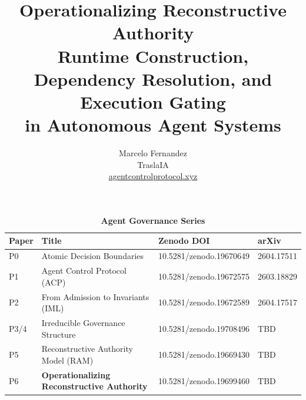 \documentclass[11pt]{article}
\title{\textbf{Operationalizing Reconstructive Authority}\\[4pt]
       \large Runtime Construction, Dependency Resolution, and Execution Gating\\
       in Autonomous Agent Systems}
\author{Marcelo Fernandez\\[2pt]
        \small TraslaIA\\[2pt]
        \small \href{https://agentcontrolprotocol.xyz}{agentcontrolprotocol.xyz}}
\date{}
\begin{document}
\maketitle


\begin{table}[h!]
\centering
\small
\caption*{\textbf{Agent Governance Series}}
\begin{tabular}{@{}llll@{}}
\toprule
\textbf{Paper} & \textbf{Title} & \textbf{Zenodo DOI} & \textbf{arXiv} \\
\midrule
P0 & Atomic Decision Boundaries~\cite{fernandez2026a}           & 10.5281/zenodo.19670649 & 2604.17511 \\
P1 & Agent Control Protocol (ACP)~\cite{fernandez2026b}         & 10.5281/zenodo.19672575 & 2603.18829 \\
P2 & From Admission to Invariants (IML)~\cite{fernandez2026c}   & 10.5281/zenodo.19672589 & 2604.17517 \\
P3/4 & Irreducible Governance Structure~\cite{fernandez2026govstr} & 10.5281/zenodo.19708496 & TBD \\
P5 & Reconstructive Authority Model (RAM)~\cite{fernandez2026ram} & 10.5281/zenodo.19669430 & TBD \\
P6 & \textbf{Operationalizing Reconstructive Authority}          & 10.5281/zenodo.19699460 & TBD \\
\bottomrule
\end{tabular}
\end{table}

\end{document}
